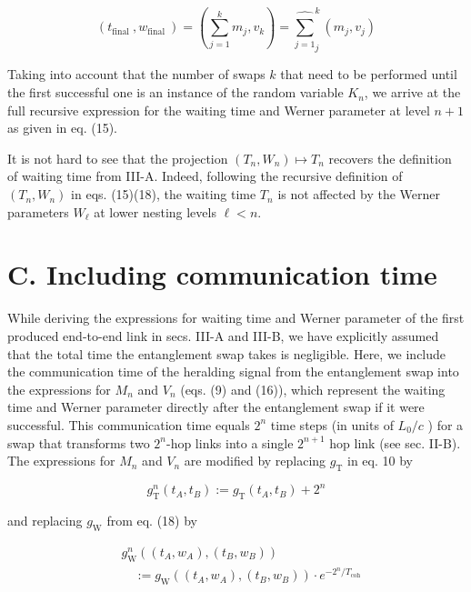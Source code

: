 \documentclass[10pt]{article}
\begin{document}
$$
\left(t_{\text {final }}, w_{\text {final }}\right)=\left(\sum_{j=1}^{k} m_{j}, v_{k}\right)={\widehat{\sum_{j=1}}}_{j}^{k}\left(m_{j}, v_{j}\right)
$$

Taking into account that the number of swaps $k$ that need to be performed until the first successful one is an instance of the random variable $K_{n}$, we arrive at the full recursive expression for the waiting time and Werner parameter at level $n+1$ as given in eq. (15).

It is not hard to see that the projection $\left(T_{n}, W_{n}\right) \mapsto T_{n}$ recovers the definition of waiting time from III-A. Indeed, following the recursive definition of $\left(T_{n}, W_{n}\right)$ in eqs. (15)(18), the waiting time $T_{n}$ is not affected by the Werner parameters $W_{\ell}$ at lower nesting levels $\ell<n$.

\section*{C. Including communication time}
While deriving the expressions for waiting time and Werner parameter of the first produced end-to-end link in secs. III-A and III-B, we have explicitly assumed that the total time the entanglement swap takes is negligible. Here, we include the communication time of the heralding signal from the entanglement swap into the expressions for $M_{n}$ and $V_{n}$ (eqs. (9) and (16)), which represent the waiting time and Werner parameter directly after the entanglement swap if it were successful. This communication time equals $2^{n}$ time steps (in units of $L_{0} / c$ ) for a swap that transforms two $2^{n}$-hop links into a single $2^{n+1}$ hop link (see sec. II-B). The expressions for $M_{n}$ and $V_{n}$ are modified by replacing $g_{\mathrm{T}}$ in eq. 10 by


\begin{equation*}
g_{\mathrm{T}}^{n}\left(t_{A}, t_{B}\right):=g_{\mathrm{T}}\left(t_{A}, t_{B}\right)+2^{n} \tag{21}
\end{equation*}


and replacing $g_{\mathrm{W}}$ from eq. (18) by


\begin{align*}
& g_{\mathrm{W}}^{n}\left(\left(t_{A}, w_{A}\right),\left(t_{B}, w_{B}\right)\right) \\
& \quad:=g_{\mathrm{W}}\left(\left(t_{A}, w_{A}\right),\left(t_{B}, w_{B}\right)\right) \cdot e^{-2^{n} / T_{\mathrm{coh}}} \tag{22}
\end{align*}
\end{document}
